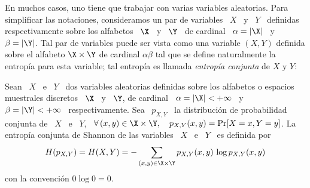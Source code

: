En muchos  casos, uno tiene que  trabajar con varias  variables aleatorias. Para
simplificar las notaciones, consideramos  un par de variables \ $X$ \  y \ $Y$ \
definidas respectivamente sobre los alfabetos \ $\X$  \ y \ $\Y$ \ de cardinal \
$\alpha = |\X|$ \ y \ $\beta = |\Y|$.  Tal par de variables puede ser vista como
una  variable $(X,Y)$  definida sobre  el alfabeto  $\X \times  \Y$  de cardinal
$\alpha \beta$ tal que se  define naturalmente la entrop\'ia para esta variable;
tal entrop\'ia es llamada {\it entrop\'ia conjunta} de $X$ y $Y$:
%
\begin{definicion}[Entrop\'ia conjunta]\label{def:SZ:EntropiaConjunta}
  Sean \ $X$ \ e \ $Y$  \ dos variables aleatorias definidas sobre los alfabetos
  o espacios  muestrales discretos \ $\X$  \ y \  $\Y$, de cardinal \  $\alpha =
  |\X| <  +\infty$ \  y \  $\beta = |\Y|  < +\infty$  \ respectivamente.   Sea \
  $p_{X,Y}$ \ la distribuci\'on  de probabilidad conjunta de \ $X$ \  e \ $Y$, \
  \ie $ \forall \, (x,y) \in \X \times  \Y, \quad p_{X,Y}(x,y) = \Pr[X = x , Y =
  y]$.  La entrop\'ia conjunta de Shannon de las  variables \ $X$ \ e \ $Y$ \ es
  definida por
  \[
  H(p_{X,Y}) =  H(X,Y) = -  \sum_{(x,y) \in \X  \times \Y} p_{X,Y}(x,y)  \, \log
  p_{X,Y}(x,y)
  \]
  con la convenci\'on $0 \log 0 = 0$.
\end{definicion}

